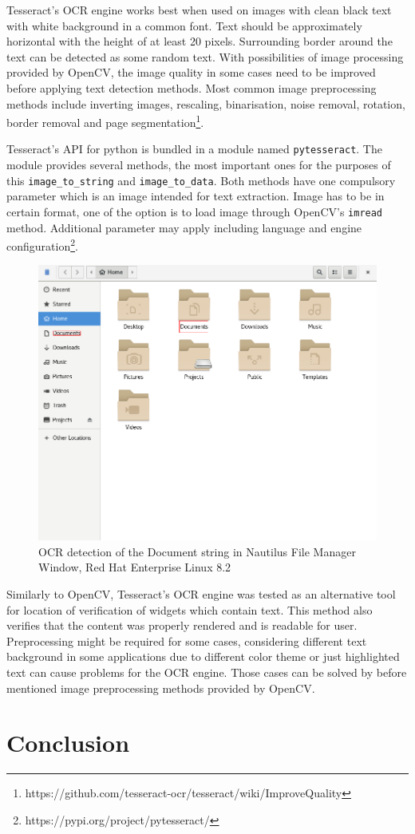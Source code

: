 Tesseract's OCR engine works best when used on images with clean black text with white background in a common font. Text should be approximately horizontal with the height of at least 20 pixels. Surrounding border around the text can be detected as some random text. With possibilities of image processing provided by OpenCV, the image quality in some cases need to be improved before applying text detection methods. Most common image preprocessing methods include inverting images, rescaling, binarisation, noise removal, rotation, border removal and page segmentation\footnote{https://github.com/tesseract-ocr/tesseract/wiki/ImproveQuality}.

Tesseract's API for python is bundled in a module named \texttt{pytesseract}. The module provides several methods, the most important ones for the purposes of this \verb|image_to_string| and \verb|image_to_data|. Both methods have one compulsory parameter which is an image intended for text extraction. Image has to be in certain format, one of the option is to load image through OpenCV's \texttt{imread} method. Additional parameter may apply including language and engine configuration\footnote{https://pypi.org/project/pytesseract/}.

\begin{figure}[hbt]
	\centering
	\includegraphics[width=1\textwidth]{obrazky-figures/ocr+nautilus.png}
	\caption{OCR detection of the Document string in Nautilus File Manager Window, Red Hat Enterprise Linux 8.2}
	\label{ocr_nautilus}
\end{figure}

Similarly to OpenCV, Tesseract's OCR engine was tested as an alternative tool for location of verification of widgets which contain text. This method also verifies that the content was properly rendered and is readable for user. Preprocessing might be required for some cases, considering different text background in some applications due to different color theme or just highlighted text can cause problems for the OCR engine. Those cases can be solved by before mentioned image preprocessing methods provided by OpenCV. 

\section{Conclusion}